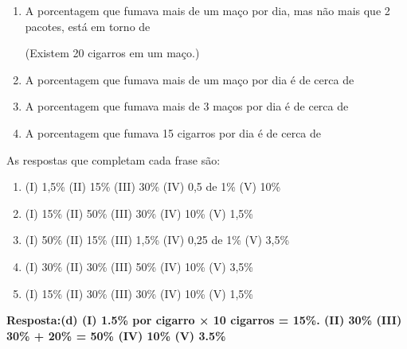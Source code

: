\documentclass[12pt]{article}\documentclass[brazilian,12pt,a4paper,final]{article}
\begin{document}
\begin{enumerate}
\begin{enumerate}[label=(\Roman*)]
\item A porcentagem que fumava mais de um maço por dia, mas não mais que 2
pacotes, está em torno de




(Existem 20 cigarros em um maço.)
\item A porcentagem que fumava mais de um maço por dia é de cerca de

\item A porcentagem que fumava mais de 3 maços por dia é de cerca de

\item A porcentagem que fumava 15 cigarros por dia é de cerca de

\end{enumerate}
As respostas que completam cada frase são:
\begin{enumerate}[label=(\alph*)]
\item (I) 1,5\% (II) 15\% (III) 30\% (IV) 0,5 de 1\% (V) 10\%
\item (I) 15\% (II) 50\% (III) 30\% (IV) 10\% (V) 1,5\%
\item (I) 50\% (II) 15\% (III) 1,5\% (IV) 0,25 de 1\% (V) 3,5\%
\item (I) 30\% (II) 30\% (III) 50\% (IV) 10\% (V) 3,5\%
\item (I) 15\% (II) 30\% (III) 30\% (IV) 10\% (V) 1,5\%

\end{enumerate}

\textbf{Resposta:(d) (I) 1.5\% por cigarro × 10 cigarros = 15\%.
(II) 30\% (III) 30\% + 20\% = 50\% (IV) 10\% (V) 3.5\%}


\end{enumerate}
\end{document}

